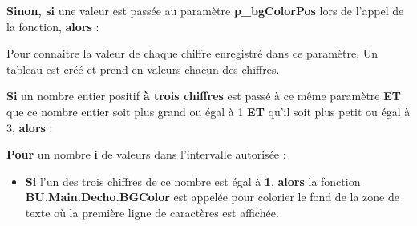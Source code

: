 \documentclass[a4paper,10pt]{article}
\begin{document}
    \setlength{\parskip}{1em}

    \begin{justify}
        \textbf{\color{cond}Sinon, si} une valeur est passée au paramètre \textbf{\color{vars}p\_bgColorPos} lors de l'appel de la fonction, \textbf{\color{cond}alors} :
    \end{justify}

    \begin{itemize}
        \item
        {
            \begin{justify}                                                                                                                          \mbox{}
                Pour connaitre la valeur de chaque chiffre enregistré dans ce paramètre, Un tableau est créé et prend en valeurs chacun des chiffres.\\\mbox{}
            \end{justify}

            \begin{justify}
                \textbf{\color{cond}Si} un nombre entier positif \textbf{à trois chiffres} est passé à ce même paramètre \textbf{ET} que ce nombre entier soit plus grand ou égal à 1 \textbf{ET} qu'il soit plus petit ou égal à 3, \textbf{\color{cond}alors} :
            \end{justify}

            \begin{justify}
                \item
                {
                    \begin{justify}
                        \textbf{\color{loop}Pour} un nombre \textbf{\color{vars}i} de valeurs dans l'intervalle autorisée :
                    \end{justify}

                    \setlength{\parskip}{1em}

                    \begin{itemize}
                        \item
                        {
                            \begin{justify}
                                \textbf{\color{cond}Si} l'un des trois chiffres de ce nombre est égal à \textbf{1}, \textbf{\color{cond}alors} la fonction \textbf{\color{func}BU.Main.Decho.BGColor} est appelée pour colorier le fond de la zone de texte où la première ligne de caractères est affichée.
                            \end{justify}\setlength{\parskip}{1em}

}
\end{itemize}}
\end{justify}}
\end{itemize}
\end{document}
